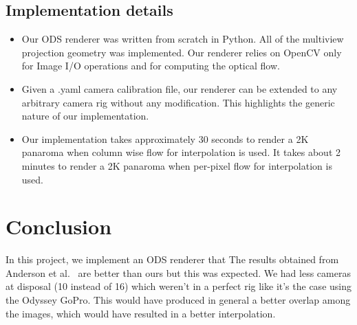 \documentclass[10pt,twocolumn,letterpaper]{article}
\begin{document}
\subsection{Implementation details}
\begin{itemize}
\item Our ODS renderer was written from scratch in Python. All of the multiview projection geometry was implemented. Our renderer relies on OpenCV only for Image I/O operations and for computing the optical flow. 
\item Given a .yaml camera calibration file, our renderer can be extended to any arbitrary camera rig without any modification. This highlights the generic nature of our implementation. 
\item Our implementation takes approximately 30 seconds to render a 2K panaroma when column wise flow for interpolation is used. It takes about 2 minutes to render a 2K panaroma when per-pixel flow for interpolation is used. 
\end{itemize}
\section{Conclusion}
\label{conclusion}
In this project, we implement an ODS renderer that The results obtained from Anderson et al.~\cite{jump16} are better than ours but this was expected. We had less cameras at disposal (10 instead of 16) which weren't in a perfect rig like it's the case using the Odyssey GoPro. This would have produced in general a better overlap among the images, which would have resulted in a better interpolation.

{\small


}
\end{document}
